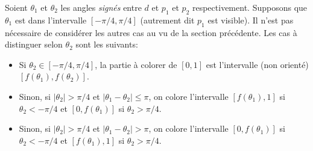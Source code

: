 Soient $\theta_1$ et $\theta_2$ les angles \emph{signés}
entre $d$ et $p_1$ et $p_2$
respectivement. Supposons que $\theta_1$ est dans l'intervalle $[-\pi/4, \pi/4]$
(autrement dit $p_1$ est visible). Il n'est pas nécessaire de considérer
les autres cas au vu de la section précédente. Les cas à distinguer selon
$\theta_2$ sont les suivants:

\begin{itemize}
  \item Si $\theta_2\in[-\pi/4, \pi/4]$, la partie à colorer de $[0, 1]$ est
    l'intervalle (non orienté) $[f(\theta_1), f(\theta_2)]$.
  \item Sinon, si $|\theta_2|>\pi/4$ et $|\theta_1-\theta_2|\leq \pi$,
    on colore l'intervalle $[f(\theta_1), 1]$ si $\theta_2<-\pi/4$ et
    $[0, f(\theta_1)]$ si $\theta_2>\pi/4$.
  \item Sinon, si $|\theta_2|>\pi/4$ et $|\theta_1-\theta_2|> \pi$,
    on colore l'intervalle $[0, f(\theta_1)]$ si $\theta_2<-\pi/4$ et
    $[f(\theta_1), 1]$ si $\theta_2>\pi/4$.
\end{itemize}


